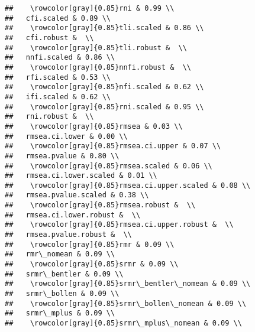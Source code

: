 \begin{knitrout}
\begin{kframe}
\begin{verbatim}
##    \rowcolor[gray]{0.85}rni & 0.99 \\ 
##   cfi.scaled & 0.89 \\ 
##    \rowcolor[gray]{0.85}tli.scaled & 0.86 \\ 
##   cfi.robust &  \\ 
##    \rowcolor[gray]{0.85}tli.robust &  \\ 
##   nnfi.scaled & 0.86 \\ 
##    \rowcolor[gray]{0.85}nnfi.robust &  \\ 
##   rfi.scaled & 0.53 \\ 
##    \rowcolor[gray]{0.85}nfi.scaled & 0.62 \\ 
##   ifi.scaled & 0.62 \\ 
##    \rowcolor[gray]{0.85}rni.scaled & 0.95 \\ 
##   rni.robust &  \\ 
##    \rowcolor[gray]{0.85}rmsea & 0.03 \\ 
##   rmsea.ci.lower & 0.00 \\ 
##    \rowcolor[gray]{0.85}rmsea.ci.upper & 0.07 \\ 
##   rmsea.pvalue & 0.80 \\ 
##    \rowcolor[gray]{0.85}rmsea.scaled & 0.06 \\ 
##   rmsea.ci.lower.scaled & 0.01 \\ 
##    \rowcolor[gray]{0.85}rmsea.ci.upper.scaled & 0.08 \\ 
##   rmsea.pvalue.scaled & 0.38 \\ 
##    \rowcolor[gray]{0.85}rmsea.robust &  \\ 
##   rmsea.ci.lower.robust &  \\ 
##    \rowcolor[gray]{0.85}rmsea.ci.upper.robust &  \\ 
##   rmsea.pvalue.robust &  \\ 
##    \rowcolor[gray]{0.85}rmr & 0.09 \\ 
##   rmr\_nomean & 0.09 \\ 
##    \rowcolor[gray]{0.85}srmr & 0.09 \\ 
##   srmr\_bentler & 0.09 \\ 
##    \rowcolor[gray]{0.85}srmr\_bentler\_nomean & 0.09 \\ 
##   srmr\_bollen & 0.09 \\ 
##    \rowcolor[gray]{0.85}srmr\_bollen\_nomean & 0.09 \\ 
##   srmr\_mplus & 0.09 \\ 
##    \rowcolor[gray]{0.85}srmr\_mplus\_nomean & 0.09 \\ 

\end{verbatim}
\end{kframe}
\end{knitrout}
